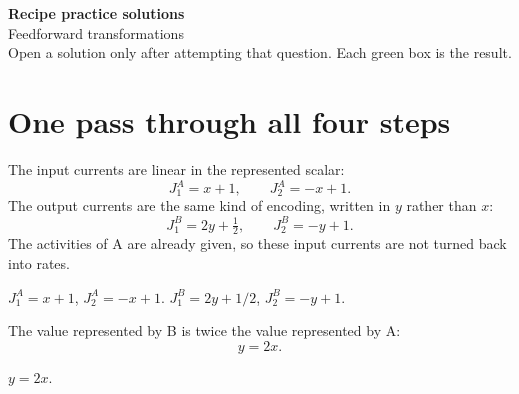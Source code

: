 \documentclass[11pt,letterpaper]{article}
\newcommand{\ans}[1]{\par\vspace{2pt}{\bfseries #1}\quad}
\begin{document}
\begin{center}
{\Large\bfseries Recipe practice solutions}\\[2pt]
{\large Feedforward transformations}\\[4pt]
Open a solution only after attempting that question. Each green box is the result.
\end{center}

\section{One pass through all four steps}

\ans{1.}
The input currents are linear in the represented scalar:
\[
J_1^{A} = x + 1, \qquad J_2^{A} = -x + 1.
\]
The output currents are the same kind of encoding, written in $y$ rather than $x$:
\[
J_1^{B} = 2y + \tfrac12, \qquad J_2^{B} = -y + 1.
\]
The activities of A are already given, so these input currents are not turned back into rates.
\begin{result}
$J_1^A = x + 1$, $J_2^A = -x + 1$. \quad $J_1^B = 2y + 1/2$, $J_2^B = -y + 1$.
\end{result}

\ans{2.}
The value represented by B is twice the value represented by A:
\[
y = 2x.
\]
\begin{result}
$y = 2x$.
\end{result}
\end{document}
